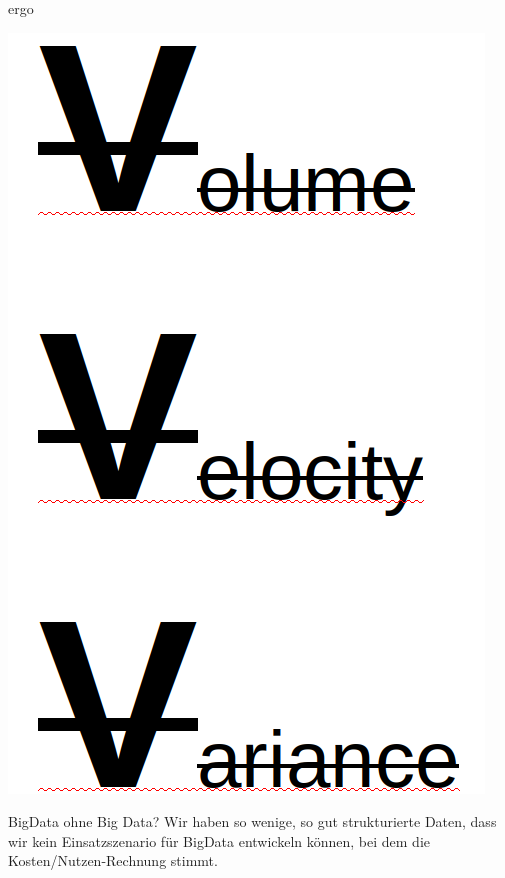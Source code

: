 \begin{frame}{ergo}
  \begin{center}
    \includegraphics[height=0.8\textheight]{pics/nix_v}
  \end{center}
\end{frame}

\begin{frame}{BigData ohne Big Data?}
    Wir haben so wenige, so gut strukturierte Daten, dass wir kein Einsatzszenario für BigData entwickeln können, bei dem die Kosten/Nutzen-Rechnung stimmt.
\end{frame}


